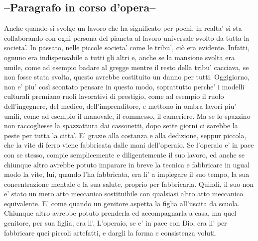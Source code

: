 \subsection{--Paragrafo in corso d'opera--}
Anche quando si svolge un lavoro che ha significato per pochi, in realta' si sta collaborando con ogni persona del pianeta al lavoro universale svolto da tutta la societa'. In passato, nelle piccole societa' come le tribu', ciò era evidente. Infatti, ognuno era indispensabile a tutti gli altri e, anche se la mansione svolta era umile, come ad esempio badare al gregge mentre il resto della tribu' cacciava,  se non fosse stata svolta, questo avrebbe costituito un danno per tutti. Oggigiorno, non e' piu' così scontato pensare in questo modo, soprattutto perche' i modelli culturali premiano ruoli lavorativi di prestigio, come ad esempio il ruolo dell’ingegnere, del medico, dell’imprenditore, e mettono in ombra lavori piu' umili, come ad esempio il manovale, il commesso, il cameriere. Ma se lo spazzino non raccogliesse la spazzattura dai cassonetti, dopo sette giorni ci sarebbe la peste per tutta la citta’. E’ grazie alla costanza e alla dedizione, seppur piccola, che la vite di ferro viene fabbricata dalle mani dell’operaio. Se l’operaio e’ in pace con se stesso, compie semplicemente e diligentemente il suo lavoro, ed anche se chiunque altro avrebbe potuto imparare in breve la tecnica e fabbricare in ugual modo la vite, lui, quando l’ha fabbricata, era li’ a impiegare il suo tempo, la sua concentrazione mentale e la sua salute, proprio per fabbricarla. Quindi, il suo non e’ stato un mero atto meccanico sostituibile con qualsiasi altro atto meccanico equivalente. E’ come quando un genitore aspetta la figlia all’uscita da scuola. Chiunque altro avrebbe potuto prenderla ed accompagnarla a casa, ma quel genitore, per sua figlia, era li’. L’operaio, se e’ in pace con Dio, era li’ per fabbricare quei piccoli artefatti, e dargli la forma e consistenza voluti.

